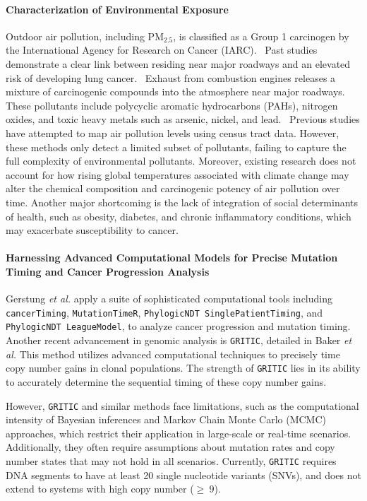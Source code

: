 \paragraph{Characterization of Environmental Exposure}
Outdoor air pollution, including PM$_{2.5}$, is classified as a Group 1 carcinogen by the International Agency for Research on Cancer (IARC).~\cite{gowda_ambient_2019} 
Past studies demonstrate a clear link between residing near major roadways and an elevated risk of developing lung cancer.~\cite{gowda_ambient_2019} 
Exhaust from combustion engines releases a mixture of carcinogenic compounds into the atmosphere near major roadways. 
These pollutants include polycyclic aromatic hydrocarbons (PAHs), nitrogen oxides, and toxic heavy metals such as arsenic, nickel, and lead.~\cite{yu_characterization_2015} 
Previous studies have attempted to map air pollution levels using census tract data.
However, these methods only detect a limited subset of pollutants, failing to capture the full complexity of environmental pollutants.
Moreover, existing research does not account for how rising global temperatures associated with climate change 
may alter the chemical composition and carcinogenic potency of air pollution over time. 
Another major shortcoming is the lack of integration of social determinants of health, 
such as obesity, diabetes, and chronic inflammatory conditions, which may exacerbate susceptibility to cancer.

\paragraph{Harnessing Advanced Computational Models for Precise Mutation Timing and Cancer Progression Analysis}

Gerstung \textit{et al.} apply a suite of sophisticated computational tools including 
\texttt{cancerTiming}, \texttt{MutationTimeR}, \texttt{PhylogicNDT SinglePatientTiming}, and \texttt{PhylogicNDT LeagueModel}, 
to analyze cancer progression and mutation timing. 
Another recent advancement in genomic analysis is \texttt{GRITIC}, detailed in Baker \textit{et al.}
This method utilizes advanced computational techniques to precisely time copy number gains in clonal populations. 
The strength of \texttt{GRITIC} lies in its ability to accurately determine the sequential timing of these copy number gains.

\vspace{1em}
\noindent
However, \texttt{GRITIC} and similar methods face limitations, such as the computational intensity of Bayesian inferences 
and Markov Chain Monte Carlo (MCMC) approaches, which restrict their application in large-scale or real-time scenarios. 
Additionally, they often require assumptions about mutation rates and copy number states that may not hold in all scenarios.
Currently, \texttt{GRITIC} requires DNA segments to have at least 20 single nucleotide variants (SNVs), 
and does not extend to systems with high copy number ($\geq~9$).~\cite{baker_history_2023}

